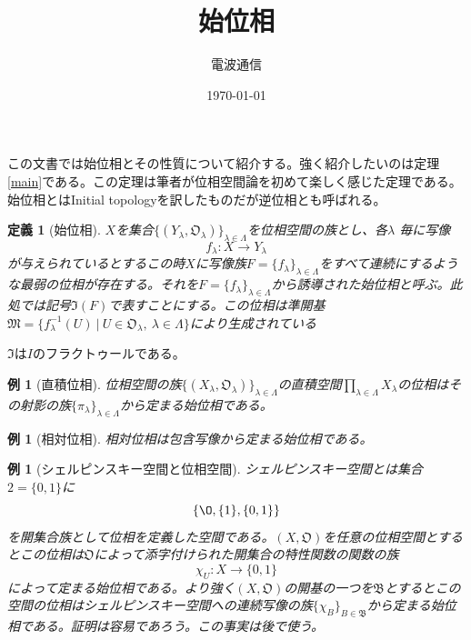 \documentclass{jsarticle}
\title{始位相}
\author{電波通信}
\date{\today}
\newtheorem{defnition}[theorem]{定義}
\newtheorem{example}[theorem]{例}
\begin{document}
\maketitle
この文書では始位相とその性質について紹介する。強く紹介したいのは定理\ref{main}である。この定理は筆者が位相空間論を初めて楽しく感じた定理である。始位相とはInitial topologyを訳したものだが逆位相とも呼ばれる。
\begin{defnition}[始位相]
$X$を集合$\{(Y_{\lambda},\mathfrak{O}_{\lambda})\}_{\lambda \in \Lambda}$を位相空間の族とし、各$\lambda$ 毎に写像
\[
f_{\lambda}:X\rightarrow Y_{\lambda}
\]が与えられているとするこの時$X$に写像族$F=\{f_{\lambda}\}_{\lambda \in \Lambda}$をすべて連続にするような最弱の位相が存在する。それを$F=\{f_{\lambda}\}_{\lambda \in \Lambda}$から誘導された始位相と呼ぶ。此処では記号$\mathfrak{I}(F)$で表すことにする。この位相は準開基$\mathfrak{M}=\{f_{\lambda}^{-1}(U)\ |\ U\in \mathfrak{O}_{\lambda},\ \lambda\in \Lambda \}$により生成されている
\end{defnition}$\mathfrak{I}$は$I$のフラクトゥールである。

\begin{example}[直積位相]
位相空間の族$\{(X_{\lambda},\mathfrak{O}_{\lambda})\}_{\lambda \in \Lambda}$の直積空間$\displaystyle \prod_{\lambda \in \Lambda}X_{\lambda}$の位相はその射影の族$\{\pi_{\lambda}\}_{\lambda \in \Lambda}$から定まる始位相である。
\end{example}

\begin{example}[相対位相]
相対位相は包含写像から定まる始位相である。
\end{example}

\begin{example}[シェルピンスキー空間と位相空間]シェルピンスキー空間とは集合$2=\{0,1\}$に
\[
\{\O,\{1\},\{0,1\}\}
\]
を開集合族として位相を定義した空間である。$(X,\mathfrak{O})$を任意の位相空間とするとこの位相は$\mathfrak{O}$によって添字付けられた開集合の特性関数の関数の族
\[
\chi_{U}:X\rightarrow \{0,1\}
\]によって定まる始位相である。より強く$(X,\mathfrak{O})$の開基の一つを$\mathfrak{B}$とするとこの空間の位相はシェルピンスキー空間への連続写像の族$\{\chi_{B}\}_{B\in \mathfrak{B}}$から定まる始位相である。証明は容易であろう。この事実は後で使う。
\end{example}
\end{document}
